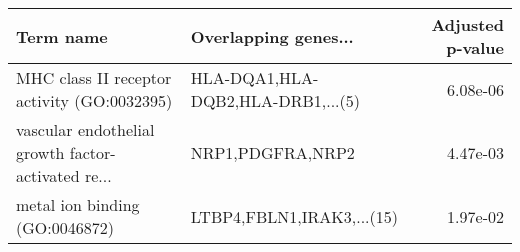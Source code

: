 \begin{tabular}{llr}
\toprule
                                         Term name &              Overlapping genes... &  Adjusted p-value \\
\midrule
       MHC class II receptor activity (GO:0032395) & HLA-DQA1,HLA-DQB2,HLA-DRB1,...(5) &          6.08e-06 \\
vascular endothelial growth factor-activated re... &                  NRP1,PDGFRA,NRP2 &          4.47e-03 \\
                    metal ion binding (GO:0046872) &         LTBP4,FBLN1,IRAK3,...(15) &          1.97e-02 \\
\bottomrule
\end{tabular}
